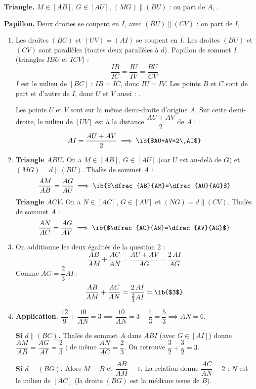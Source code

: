 \begin{prop}
\textbf{Triangle.} $M\in[AB]$, $G\in[AU]$, $(MG)\parallel(BU)$ : on part de $A$, .

\textbf{Papillon.} Deux droites se coupent en $I$, avec $(BU)\parallel(CV)$ : on part de $I$, .
\end{prop}
\begin{enumerate}
  \item Les droites $(BC)$ et $(UV)=(AI)$ se coupent en $I$. Les droites $(BU)$ et $(CV)$ sont parallèles (toutes deux parallèles à $d$). Papillon de sommet $I$ (triangles $IBU$ et $ICV$) :
  \[\dfrac{IB}{IC}=\dfrac{IU}{IV}=\dfrac{BU}{CV}\]
  $I$ est le milieu de $[BC]$ : $IB=IC$, donc $IU=IV$. Les points $B$ et $C$ sont de part et d'autre de $I$, donc $U$ et $V$ aussi : .

  Les points $U$ et $V$ sont sur la même demi-droite d'origine $A$. Sur cette demi-droite, le milieu de $[UV]$ est à la distance $\dfrac{AU+AV}2$ de $A$ :
  \[AI=\dfrac{AU+AV}2\implies\ib{$AU+AV=2\,AI$}\]

  \item \textbf{Triangle $ABU$.} On a $M\in[AB]$, $G\in[AU]$ (car $U$ est au-delà de $G$) et $(MG)=d\parallel(BU)$. Thalès de sommet $A$ :
  \[\dfrac{AM}{AB}=\dfrac{AG}{AU}\implies\ib{$\dfrac{AB}{AM}=\dfrac{AU}{AG}$}\]
  \textbf{Triangle $ACV$.} On a $N\in[AC]$, $G\in[AV]$ et $(NG)=d\parallel(CV)$. Thalès de sommet $A$ :
  \[\dfrac{AN}{AC}=\dfrac{AG}{AV}\implies\ib{$\dfrac{AC}{AN}=\dfrac{AV}{AG}$}\]

  \item On additionne les deux égalités de la question 2 :
  \[\dfrac{AB}{AM}+\dfrac{AC}{AN}=\dfrac{AU+AV}{AG}=\dfrac{2\,AI}{AG}\]
  Comme $AG=\dfrac23AI$ :
  \[\dfrac{AB}{AM}+\dfrac{AC}{AN}=\dfrac{2\,AI}{\frac23AI}=\ib{$3$}\]

  \item \textbf{Application.} $\dfrac{12}9+\dfrac{10}{AN}=3\implies\dfrac{10}{AN}=3-\dfrac43=\dfrac53\implies AN=\boxed{6}$.

  \textbf{Si $d\parallel(BC)$.} Thalès de sommet $A$ dans $ABI$ (avec $G\in[AI]$) donne $\dfrac{AM}{AB}=\dfrac{AG}{AI}=\dfrac23$ ; de même $\dfrac{AN}{AC}=\dfrac23$. On retrouve $\dfrac32+\dfrac32=3$.

  \textbf{Si $d=(BG)$.} Alors $M=B$ et $\dfrac{AB}{AM}=1$. La relation donne $\dfrac{AC}{AN}=2$ : $N$ est le milieu de $[AC]$ (la droite $(BG)$ est la médiane issue de $B$).


\end{enumerate}
